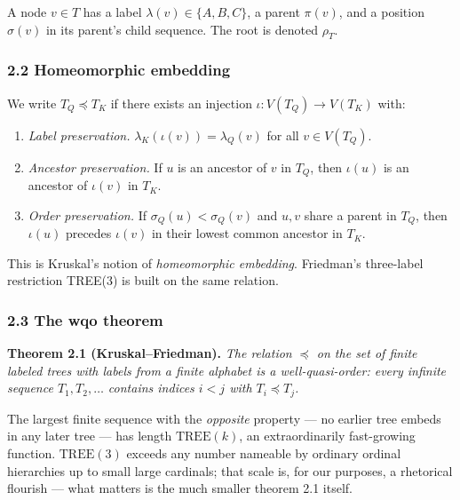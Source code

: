 \documentclass[
  11pt,
]{article}
\providecommand{\tightlist}{%
  \setlength{\itemsep}{0pt}\setlength{\parskip}{0pt}}
\begin{document}
A node \(v \in T\) has a label \(\lambda(v) \in \{A,B,C\}\), a parent
\(\pi(v)\), and a position \(\sigma(v)\) in its parent's child sequence.
The root is denoted \(\rho_T\).

\hypertarget{homeomorphic-embedding}{%
\subsubsection{2.2 Homeomorphic
embedding}\label{homeomorphic-embedding}}

We write \(T_Q \preceq T_K\) if there exists an injection
\(\iota : V(T_Q) \to V(T_K)\) with:

\begin{enumerate}
\def\labelenumi{\arabic{enumi}.}
\tightlist
\item
  \emph{Label preservation.} \(\lambda_K(\iota(v)) = \lambda_Q(v)\) for
  all \(v \in V(T_Q)\).
\item
  \emph{Ancestor preservation.} If \(u\) is an ancestor of \(v\) in
  \(T_Q\), then \(\iota(u)\) is an ancestor of \(\iota(v)\) in \(T_K\).
\item
  \emph{Order preservation.} If \(\sigma_Q(u) < \sigma_Q(v)\) and
  \(u, v\) share a parent in \(T_Q\), then \(\iota(u)\) precedes
  \(\iota(v)\) in their lowest common ancestor in \(T_K\).
\end{enumerate}

This is Kruskal's notion of \emph{homeomorphic embedding}. Friedman's
three-label restriction TREE(3) is built on the same relation.

\hypertarget{the-wqo-theorem}{%
\subsubsection{2.3 The wqo theorem}\label{the-wqo-theorem}}

\textbf{Theorem 2.1 (Kruskal--Friedman).} \emph{The relation \(\preceq\)
on the set of finite labeled trees with labels from a finite alphabet is
a well-quasi-order: every infinite sequence \(T_1, T_2, \dots\) contains
indices \(i < j\) with \(T_i \preceq T_j\).}

The largest finite sequence with the \emph{opposite} property --- no
earlier tree embeds in any later tree --- has length
\(\mathrm{TREE}(k)\), an extraordinarily fast-growing function.
\(\mathrm{TREE}(3)\) exceeds any number nameable by ordinary ordinal
hierarchies up to small large cardinals; that scale is, for our
purposes, a rhetorical flourish --- what matters is the much smaller
theorem 2.1 itself.
\end{document}
